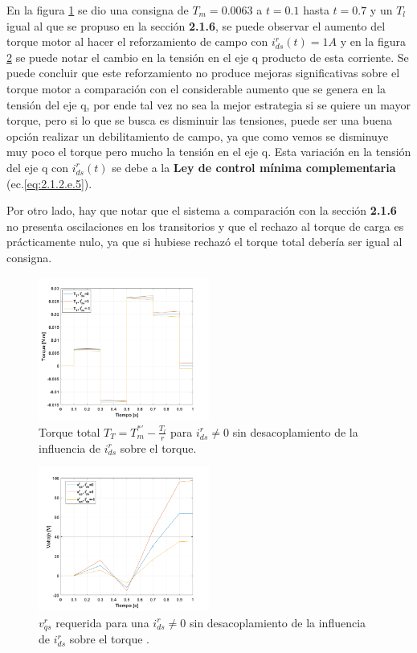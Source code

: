 \documentclass[10pt]{article}
\begin{document}
\begin{itemize}
	En la figura \ref{fig:TTmodulador_id} se dio una consigna de $T_{m}=0.0063$ a $t=0.1$ hasta $t=0.7$ y un $T_{l}$ igual al que se propuso en la sección \textbf{2.1.6}, se puede observar el aumento del torque motor al hacer el reforzamiento de campo con $i^{r}_{ds}(t)=1 A$ y en la figura \ref{fig:vqmodulador_id} se puede notar el cambio en la tensión en el eje q producto de esta corriente.
	Se puede concluir que este reforzamiento no produce mejoras significativas sobre el torque motor a comparación con el considerable aumento que se genera en la tensión del eje q, por ende tal vez no sea la mejor estrategia si se quiere un mayor torque, pero si lo que se busca es disminuir las tensiones, puede ser una buena opción realizar un debilitamiento de campo, ya que como vemos se disminuye muy poco el torque pero mucho la tensión en el eje q.
	Esta variación en la tensión del eje q con $i^{r}_{ds}(t)$  se debe a la \textbf{Ley de control mínima complementaria} (ec.\ref{eq:2.1.2.e.5}).
	
	Por otro lado, hay que notar que el sistema a comparación con la sección \textbf{2.1.6} no presenta oscilaciones en los transitorios y que el rechazo al torque de carga es prácticamente nulo, ya que si hubiese rechazó el torque total debería ser igual al consigna. 
	 	\begin{figure}[h!]
	\centering
	\includegraphics[width=0.5\textwidth]{TTmodulador_id.png}
	\caption{\label{fig:TTmodulador_id}Torque total $T_{T}=T^{*'}_{m}-\frac{T_{l}}{r}$ para $i^{r}_{ds}\neq0$ sin desacoplamiento de la influencia de $i^{r}_{ds}$ sobre el torque.}
	\end{figure}
		 	\begin{figure}[h!]
	\centering
	\includegraphics[width=0.5\textwidth]{Tmodulador_id.png}
	\caption{\label{fig:vqmodulador_id}$v^{r}_{qs}$ requerida para una $i^{r}_{ds}\neq0$ sin desacoplamiento de la influencia de $i^{r}_{ds}$ sobre el torque .}
	\end{figure}
\end{itemize}
\end{document}
